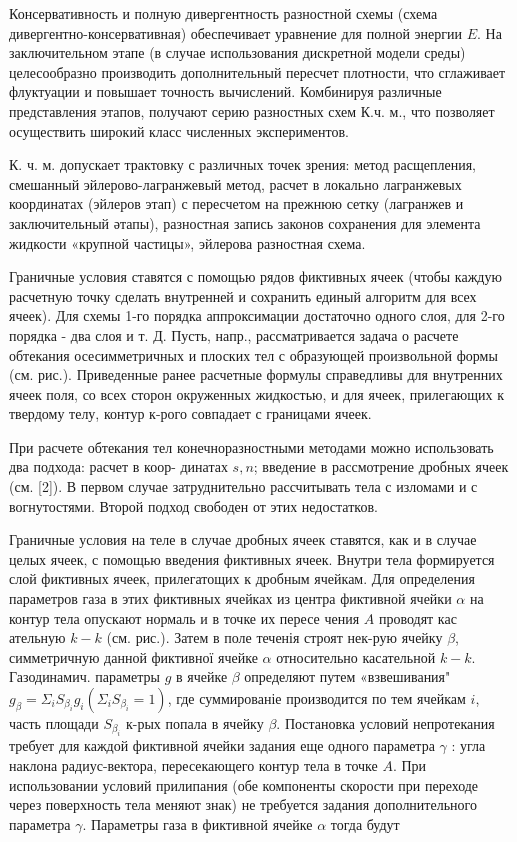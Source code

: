 \documentclass[10pt]{article}
\begin{document}
Консервативность и полную дивергентность разностной схемы (схема дивергентно-консервативная) обеспечивает уравнение для полной энергии $E$. На заключительном этапе (в случае использования дискретной модели среды) целесообразно производить дополнительный пересчет плотности, что сглаживает флуктуации и повышает точность вычислений. Комбинируя различные представления этапов, получают серию разностных схем К.ч. м., что позволяет осуществить широкий класс численных экспериментов.



К. ч. м. допускает трактовку с различных точек зрения: метод расщепления, смешанный эйлерово-лагранжевый метод, расчет в локально лагранжевых координатах (эйлеров этап) с пересчетом на прежнюю сетку (лагранжев и заключительный әтапы), разностная запись законов сохранения для элемента жидкости «крупной частицы», эйлерова разностная схема.



Граничные условия ставятся с помощью рядов фиктивных ячеек (чтобы каждую расчетную точку сделать внутренней и сохранить единый алгоритм для всех ячеек). Для схемы 1-го порядка аппроксимации достаточно одного слоя, для 2-го порядка - два слоя и т. Д. Пусть, напр., рассматривается задача о расчете обтекания осесимметричных и плоских тел с образующей произвольной формы (см. рис.). Приведенные ранее расчетные формулы справедливы для внутренних ячеек поля, со всех сторон окруженных жидкостью, и для ячеек, прилегающих к твердому телу, контур к-рого совпадает с границами ячеек.



При расчете обтекания тел конечноразностными методами можно использовать два подхода: расчет в коор- динатах $s, n$; введение в рассмотрение дробных ячеек (см. [2]). В первом случае затруднительно рассчитывать тела с изломами и с вогнутостями. Второй подход свободен от этих недостатков.



Граничные условия на теле в случае дробных ячеек ставятся, как и в случае целых ячеек, с помощью введения фиктивных ячеек. Внутри тела формируется слой фиктивных ячеек, прилегатощих к дробным ячейкам. Для определения параметров газа в этих фиктивных ячейках из центра фиктивной ячейки $\alpha$ на контур тела опускают нормаль и в точке их пересе чения $A$ проводят кас ательную $k-k$ (см. рис.). Затем в поле теченія строят нек-рую ячейку $\beta$, симметричную данной фиктивної ячейке $\alpha$ относительно касательной $k-k$. Газодинамич. параметры $g$ в ячейке $\beta$ определяют путем «взвешивания" $g_{\beta}=\Sigma_{i} S_{\beta_{i}} g_{i}\left(\Sigma_{i} S_{\beta_{i}}=1\right)$, где суммированіе производится по тем ячейкам $i$, часть площади $S_{\beta_{i}}$ к-рых попала в ячейку $\beta$. Постановка условий непротекания требует для каждой фиктивной ячейки задания еще одного параметра $\gamma$ : угла наклона радиус-вектора, пересекающего контур тела в точке $A$. При использовании условий прилипания (обе компоненты скорости при переходе через поверхность тела меняют знак) не требуется задания дополнительного параметра $\gamma$. Параметры газа в фиктивной ячейке $\alpha$ тогда будут
\end{document}
